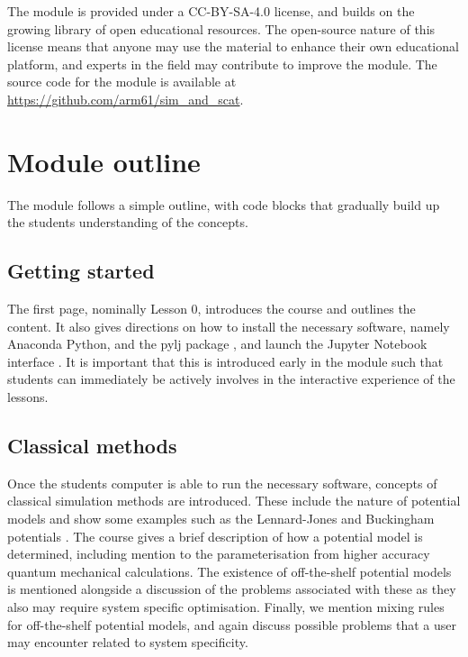 \documentclass[pdf]{iucr}              %
\begin{document}
The module is provided under a CC-BY-SA-4.0 license, and builds on the growing library of open educational resources.
The open-source nature of this license means that anyone may use the material to enhance their own educational platform, and experts in the field may contribute to improve the module.
The source code for the module is available at \url{https://github.com/arm61/sim_and_scat}.

\section{Module outline}

The module follows a simple outline, with code blocks that gradually build up the students understanding of the concepts.

\subsection{Getting started}

The first page, nominally Lesson 0, introduces the course and outlines the content.
It also gives directions on how to install the necessary software, namely Anaconda Python, and the pylj package \cite{McCluskey2018}, and launch the Jupyter Notebook interface \cite{Kluyver2016}.
It is important that this is introduced early in the module such that students can immediately be actively involves in the interactive experience of the lessons.

\subsection{Classical methods}

Once the students computer is able to run the necessary software, concepts of classical simulation methods are introduced.
These include the nature of potential models and show some examples such as the Lennard-Jones and Buckingham potentials \cite{LennardJones1924,Buckingham1938}.
The course gives a brief description of how a potential model is determined, including mention to the parameterisation from higher accuracy quantum mechanical calculations.
The existence of off-the-shelf potential models is mentioned alongside a discussion of the problems associated with these as they also may require system specific optimisation.
Finally, we mention mixing rules for off-the-shelf potential models, and again discuss possible problems that a user may encounter related to system specificity.
\end{document}
